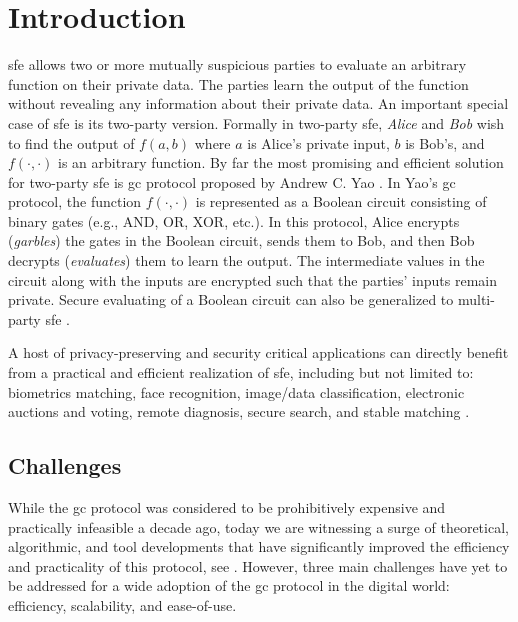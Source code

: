 \chapter{Introduction}
\acrfull{sfe} allows two or more mutually suspicious parties to evaluate an arbitrary function on their private data.
The parties learn the output of the function without revealing any information about their private data.
An important special case of \acrshort{sfe} is its two-party version.
Formally in two-party \acrshort{sfe}, \textit{Alice} and \textit{Bob} wish to find the output of $f(a, b)$ where $a$ is Alice's private input, $b$ is Bob's, and $f(\cdot,\cdot)$ is an arbitrary function.
By far the most promising and efficient solution for two-party \acrshort{sfe} is \acrfull{gc} protocol proposed by Andrew C. Yao \cite{yao1986generate}.
In Yao's \acrshort{gc} protocol, the function $f(\cdot,\cdot)$ is represented as a Boolean circuit consisting of binary gates (e.g., AND, OR, XOR, etc.).
In this protocol, Alice encrypts (\textit{garbles}) the gates in the Boolean circuit, sends them to Bob, and then Bob decrypts (\textit{evaluates}) them to learn the output.
The intermediate values in the circuit along with the inputs are encrypted such that the parties' inputs remain private.
Secure evaluating of a Boolean circuit can also be generalized to multi-party \acrshort{sfe} \cite{goldreich1987play, ben2008fairplaymp}.

A host of privacy-preserving and security critical applications can directly benefit from a practical and efficient realization of \acrshort{sfe}, including but not limited to: biometrics matching, face recognition, image/data classification, electronic auctions and voting, remote diagnosis, secure search, and stable matching \cite{riazi2017toward, zhang2016robust, bringer2013privacy, evans2011efficient, barni2009secure, naor1999privacy, brickell2007privacy, jha2008towards}.

\section{Challenges}
While the \acrshort{gc} protocol was considered to be prohibitively expensive and practically infeasible a decade ago, today we are witnessing a surge of theoretical, algorithmic, and tool developments that have significantly improved the efficiency and practicality of this protocol, see \cite{malkhi2004fairplay, kolesnikov2008improved, pinkas2009secure, huang2011faster, bellare2013efficient, zahur2015two, zahur2015obliv, liu2015oblivm}.
However, three main challenges have yet to be addressed for a wide adoption of the \acrshort{gc} protocol in the digital world: efficiency, scalability, and ease-of-use.

